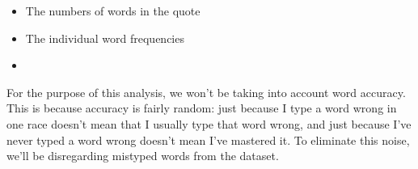 \documentclass{article}
\begin{document}
\begin{itemize}
	\item The numbers of words in the quote
	\item The individual word frequencies
	\item
\end{itemize}

For the purpose of this analysis, we won't be taking into account word accuracy. This is because accuracy is fairly random: just because I type a word wrong in one race doesn't mean that I usually type that word wrong, and just because I've never typed a word wrong doesn't mean I've mastered it. To eliminate this noise, we'll be disregarding mistyped words from the dataset.
\end{document}
